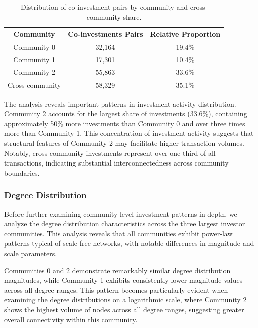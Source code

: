 \begin{table}[htbp]
\centering
\begin{tabular}{|c|c|c|}
\hline
\textbf{Community} & \textbf{Co-investments Pairs} & \textbf{Relative Proportion} \\
\hline
Community 0 & 32,164 & 19.4\% \\
Community 1 & 17,301 & 10.4\% \\
Community 2 & 55,863 & 33.6\% \\
Cross-community & 58,329 & 35.1\% \\
\hline
\end{tabular}
\caption{Distribution of co-investment pairs by community and cross-community share.}
\label{tab:investment_distribution}
\end{table}

The analysis reveals important patterns in investment activity distribution. Community 2 accounts for the largest share of investments (33.6\%), containing approximately 50\% more investments than Community 0 and over three times more than Community 1. This concentration of investment activity suggests that structural features of Community 2 may facilitate higher transaction volumes. Notably, cross-community investments represent over one-third of all transactions, indicating substantial interconnectedness across community boundaries.

\subsubsection{Degree Distribution}

Before further examining community-level investment patterns in-depth, we analyze the degree distribution characteristics across the three largest investor communities. This analysis reveals that all communities exhibit power-law patterns typical of scale-free networks, with notable differences in magnitude and scale parameters.

Communities 0 and 2 demonstrate remarkably similar degree distribution magnitudes, while Community 1 exhibits consistently lower magnitude values across all degree ranges. This pattern becomes particularly evident when examining the degree distributions on a logarithmic scale, where Community 2 shows the highest volume of nodes across all degree ranges, suggesting greater overall connectivity within this community.


